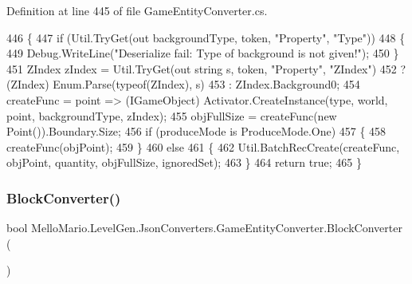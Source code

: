 Definition at line 445 of file Game\+Entity\+Converter.\+cs.


\begin{DoxyCode}
446         \{
447             \textcolor{keywordflow}{if} (Util.TryGet(out backgroundType, token, \textcolor{stringliteral}{"Property"}, \textcolor{stringliteral}{"Type"}))
448             \{
449                 Debug.WriteLine(\textcolor{stringliteral}{"Deserialize fail: Type of background is not given!"});
450             \}
451             ZIndex zIndex = Util.TryGet(out \textcolor{keywordtype}{string} s, token, \textcolor{stringliteral}{"Property"}, \textcolor{stringliteral}{"ZIndex"})
452                 ? (ZIndex) Enum.Parse(typeof(ZIndex), s)
453                 : ZIndex.Background0;
454             createFunc = point => (IGameObject) Activator.CreateInstance(type, 
      world, point, backgroundType, zIndex);
455             objFullSize = createFunc(\textcolor{keyword}{new} Point()).Boundary.Size;
456             \textcolor{keywordflow}{if} (produceMode is ProduceMode.One)
457             \{
458                 createFunc(objPoint);
459             \}
460             \textcolor{keywordflow}{else}
461             \{
462                 Util.BatchRecCreate(createFunc, objPoint, quantity, objFullSize, 
      ignoredSet);
463             \}
464             \textcolor{keywordflow}{return} \textcolor{keyword}{true};
465         \}
\end{DoxyCode}
\mbox{\label{classMelloMario_1_1LevelGen_1_1JsonConverters_1_1GameEntityConverter_acc0fb117bbbb52a28e7ff2adf75b1755}} 
\subsubsection{Block\+Converter()}
{\footnotesize\ttfamily bool Mello\+Mario.\+Level\+Gen.\+Json\+Converters.\+Game\+Entity\+Converter.\+Block\+Converter (\begin{DoxyParamCaption}{ }\end{DoxyParamCaption})\hspace{0.3cm}{\ttfamily [private]}}




